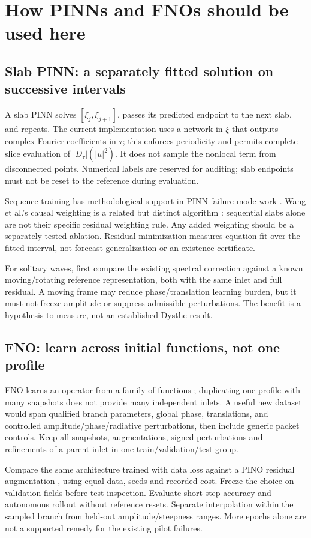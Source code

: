 \documentclass[11pt]{article}
\newcommand{\absD}{\lvert D_\tau\rvert}
\begin{document}
\newpage
\section{How PINNs and FNOs should be used here}
\subsection{Slab PINN: a separately fitted solution on successive intervals}
A slab PINN solves $[\xi_j,\xi_{j+1}]$, passes its predicted endpoint to the next
slab, and repeats. The current implementation uses a network in $\xi$ that
outputs complex Fourier coefficients in $\tau$; this enforces periodicity and
permits complete-slice evaluation of $\absD(|u|^2)$. It does not sample the
nonlocal term from disconnected points. Numerical labels are reserved for
auditing; slab endpoints must not be reset to the reference during evaluation.

Sequence training has methodological support in PINN failure-mode work
\cite{failure}. Wang et al.'s causal weighting is a related but distinct
algorithm \cite{causal}: sequential slabs alone are not their specific residual
weighting rule. Any added weighting should be a separately tested ablation.
Residual minimization measures equation fit over the fitted interval, not
forecast generalization or an existence certificate.

For solitary waves, first compare the existing spectral correction against a
known moving/rotating reference representation, both with the same inlet and
full residual. A moving frame may reduce phase/translation learning burden,
but it must not freeze amplitude or suppress admissible perturbations. The
benefit is a hypothesis to measure, not an established Dysthe result.

\subsection{FNO: learn across initial functions, not one profile}
FNO learns an operator from a family of functions \cite{fno}; duplicating one
profile with many snapshots does not provide many independent inlets. A useful
new dataset would span qualified branch parameters, global phase, translations,
and controlled amplitude/phase/radiative perturbations, then include generic
packet controls. Keep all snapshots, augmentations, signed perturbations and
refinements of a parent inlet in one train/validation/test group.

Compare the same architecture trained with data loss against a PINO residual
augmentation \cite{pino}, using equal data, seeds and recorded cost. Freeze the
choice on validation fields before test inspection. Evaluate short-step accuracy
and autonomous rollout without reference resets. Separate interpolation within
the sampled branch from held-out amplitude/steepness ranges. More epochs alone
are not a supported remedy for the existing pilot failures.
\end{document}
